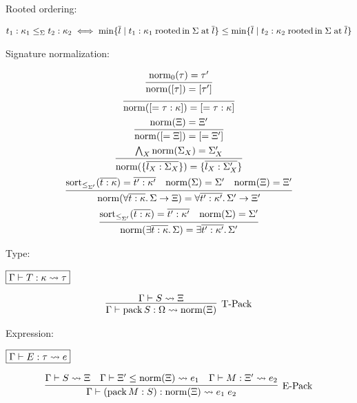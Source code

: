 Rooted ordering:

\begin{align*}
  t_1: \kappa_1 \leq_\Sigma t_2: \kappa_2 \iff
  \min\{\overline{l} \mid t_1: \kappa_1 \mathrel{\mathrm{rooted}}\, \mathrel{\mathrm{in}} \Sigma \mathrel{\mathrm{at}} \overline{l}\} \leq \min\{\overline{l} \mid t_2: \kappa_2 \mathrel{\mathrm{rooted}}\, \mathrel{\mathrm{in}} \Sigma \mathrel{\mathrm{at}} \overline{l}\}
\end{align*}

Signature normalization:

\begin{gather*}
  \infer{\symnorm([\tau]) = [\tau']}{
    \symnorm_0(\tau) = \tau'
  }
  \\
  \infer{\symnorm([= \tau: \kappa]) = [= \tau: \kappa]}{}
  \\
  \infer{\symnorm([= \Xi]) = [= \Xi']}{
    \symnorm(\Xi) = \Xi'
  }
  \\
  \infer{\symnorm(\{\overline{l_X: \Sigma_X}\}) = \{\overline{l_X: \Sigma_X'}\}}{
    \bigwedge_X \symnorm(\Sigma_X) = \Sigma_X'
  }
  \\
  \infer{\symnorm(\forall \overline{t: \kappa}\ldotp \Sigma \to \Xi) = \forall \overline{t': \kappa'}\ldotp \Sigma' \to \Xi'}{
    \symsort_{\leq_{\Sigma'}}(\overline{t: \kappa}) = \overline{t': \kappa'}
    &
    \symnorm(\Sigma) = \Sigma'
    &
    \symnorm(\Xi) = \Xi'
  }
  \\
  \infer{\symnorm(\exists \overline{t: \kappa}\ldotp \Sigma) = \exists \overline{t': \kappa'}\ldotp \Sigma'}{
    \symsort_{\leq_{\Sigma'}}(\overline{t: \kappa}) = \overline{t': \kappa'}
    &
    \symnorm(\Sigma) = \Sigma'
  }
\end{gather*}

Type:

$\fbox{$\Gamma \vdash T: \kappa \rightsquigarrow \tau$}$

\begin{gather*}
  \infer[\text{T-Pack}]{\Gamma \vdash \sympack S: \Omega \elaborate \symnorm(\Xi)}{
    \Gamma \vdash S \elaborate \Xi
  }
\end{gather*}

Expression:

$\fbox{$\Gamma \vdash E: \tau \rightsquigarrow e$}$

\begin{gather*}
  \infer[\text{E-Pack}]{\Gamma \vdash (\sympack M: S): \symnorm(\Xi) \elaborate e_1\; e_2}{
    \Gamma \vdash S \elaborate \Xi
    &
    \Gamma \vdash \Xi' \leq \symnorm(\Xi) \elaborate e_1
    &
    \Gamma \vdash M: \Xi' \elaborate e_2
  }
\end{gather*}


